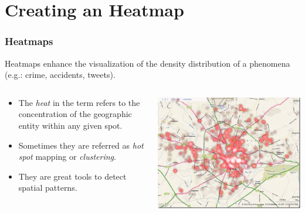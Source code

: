 \documentclass[hyperref={pdfpagelabels=true}]{beamer}
\begin{document}
\section{Creating an Heatmap} 
\begin{frame}
\frametitle{Heatmaps}

Heatmaps enhance the visualization of the density distribution of a phenomena (e.g.: crime, accidents, tweets).
\begin{columns}
  \begin{column}{0.5\textwidth}
    \begin{itemize}
	  \item<2->The \textit{heat} in the term refers to the concentration of the geographic entity within any given spot.
	  \item<3->Sometimes they are referred as \textit{hot spot} mapping or \textit{clustering}.
	  \item<4->They are great tools to detect spatial patterns.
    \end{itemize}
  \end{column}
  \begin{column}{0.5\textwidth}
    \includegraphics[width=\textwidth]{heatmap_crime.png}    
  \end{column}  
\end{columns}
\end{frame}
\end{document}
